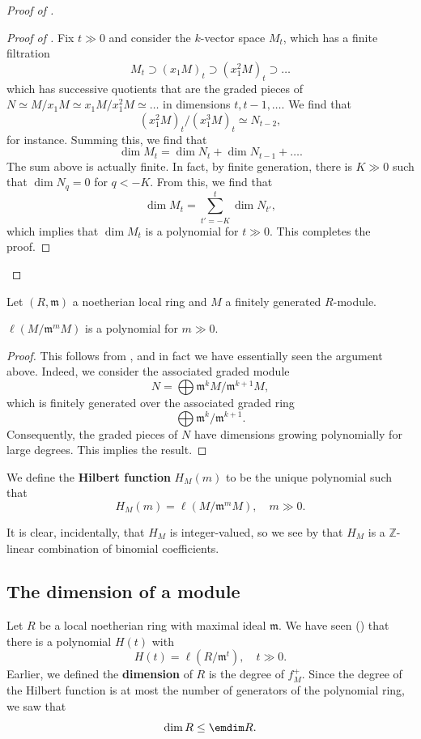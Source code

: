 \begin{proof}[Proof of  ]
\begin{proof}[Proof of ]
Fix $t \gg 0$ and consider the $k$-vector space $M_t$, which has a finite filtration 
\[ M_t \supset (x_1 M)_t \supset (x_1^2 M)_t \supset \dots  \]
which has successive quotients that are the  graded pieces of $N \simeq
M/x_1 M \simeq x_1 M/x_1^2 M \simeq \dots$ in dimensions $t, t-1, \dots$. We
find that
\[ (x_1^2 M)_t/(x_1^3 M)_t \simeq N_{t-2},  \]
for instance. Summing this, we find that
\[ \dim M_t = \dim N_t + \dim N_{t-1} + \dots . \]
The sum above is actually finite. In fact, by finite generation, there is $K
\gg 0 $ such that $\dim N_q  = 0$ for $q< -K$. From this, we find that 
\[ \dim M_t = \sum_{t' = -K}^{t} \dim N_{t'},  \]
which implies that $\dim M_t$ is a polynomial for $t \gg 0$. This completes
the proof.
\end{proof} 
\end{proof}


Let $(R, \mathfrak{m})$ a noetherian local ring and $M$ a finitely generated
$R$-module. 
\begin{proposition} \label{hilbertlocalring} 
$\ell(M/\mathfrak{m}^m M)$ is a polynomial for $m \gg 0$. 
\end{proposition} 
\begin{proof} 
This follows from , and in fact we have
essentially seen the argument above. Indeed, we consider the
associated graded module
\[ N = \bigoplus \mathfrak{m}^k M/\mathfrak{m}^{k+1}M , \]
which is finitely generated over the associated graded ring
\[ \bigoplus \mathfrak{m}^k/\mathfrak{m}^{k+1}.  \]
Consequently, the graded pieces of $N$ have dimensions growing polynomially
for large degrees. This implies the result. 

\end{proof} 
\begin{definition} 
We define the \textbf{Hilbert function} $H_M(m)$  to be the unique polynomial
such that 
\[ H_M(m) = \ell(M/ \mathfrak{m}^m M), \quad m \gg 0.  \]
\end{definition} 

It is clear, incidentally, that $H_M$ is integer-valued, so we see by
 that $H_M$ is a $\mathbb{Z}$-linear
combination of binomial coefficients.

\subsection{The dimension of a module}
Let $R $ be a local noetherian ring with maximal ideal $\mathfrak{m}$. We
have seen () that  there is a polynomial $H(t)$ with
\[ H(t) = \ell(R/\mathfrak{m}^t), \quad t \gg 0.  \]
Earlier, we defined the \textbf{dimension} of $R$ is the degree of $f_M^+$. 
Since the degree of the Hilbert function is at most the number of generators
of the polynomial ring, we saw that 
\[ \dim R \leq \emdim R.  \]

